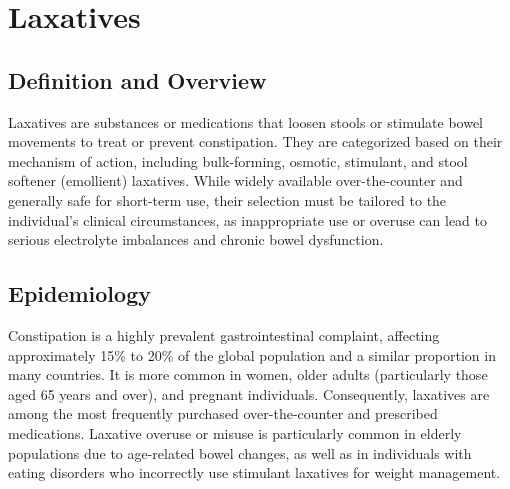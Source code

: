 \chapter{Laxatives}

\section*{Definition and Overview}
Laxatives are substances or medications that loosen stools or stimulate bowel movements to treat or prevent constipation. They are categorized based on their mechanism of action, including bulk-forming, osmotic, stimulant, and stool softener (emollient) laxatives. While widely available over-the-counter and generally safe for short-term use, their selection must be tailored to the individual's clinical circumstances, as inappropriate use or overuse can lead to serious electrolyte imbalances and chronic bowel dysfunction.

\section*{Epidemiology}
Constipation is a highly prevalent gastrointestinal complaint, affecting approximately 15\% to 20\% of the global population and a similar proportion in many countries. It is more common in women, older adults (particularly those aged 65 years and over), and pregnant individuals. Consequently, laxatives are among the most frequently purchased over-the-counter and prescribed medications. Laxative overuse or misuse is particularly common in elderly populations due to age-related bowel changes, as well as in individuals with eating disorders who incorrectly use stimulant laxatives for weight management.

